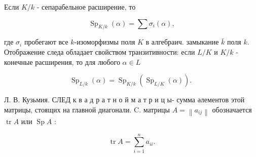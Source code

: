 \documentclass[10pt]{article}
\begin{document}
Если $K / k$ - сепарабельное расширение, то



\[

\operatorname{Sp}_{K / k}(\alpha)=\sum \sigma_{i}(\alpha),

\]



где $\sigma_{i}$ пробегают все $k$-изоморфизмы поля $K$ в алгебраич. замыкание $\bar{k}$ поля $k$. Отображение следа обладает свойством транзитивности: если $L / K$ и $K / k$ - конечные расширения, то для любого $\alpha \in L$



\[

\operatorname{Sp}_{L / k}(\alpha)=\operatorname{Sp}_{K / k}\left(\operatorname{Sp}_{L / K}(\alpha)\right) \text {. }

\]



Л. В. Кузьмия. СЛЕД к в а д р а т н о й м а т р и ц ы- сумма әлементов этой матрицы, стоящих на главной диагонали. C. матрицы $A=\left\|a_{i j}\right\|$ обозначается $\operatorname{tr} A$ или $\operatorname{Sp} A$ :



\[

\operatorname{tr} A=\sum_{i=1}^{n} a_{i i} .

\]
\end{document}
